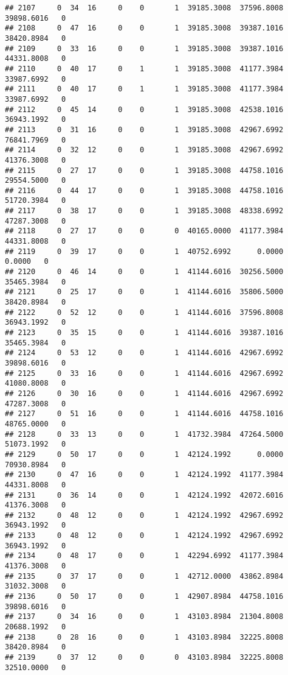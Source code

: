 \documentclass[
]{article}
\begin{document}
\begin{enumerate}
\begin{verbatim}
## 2107     0  34  16     0    0       1  39185.3008  37596.8008  39898.6016   0
## 2108     0  47  16     0    0       1  39185.3008  39387.1016  38420.8984   0
## 2109     0  33  16     0    0       1  39185.3008  39387.1016  44331.8008   0
## 2110     0  40  17     0    1       1  39185.3008  41177.3984  33987.6992   0
## 2111     0  40  17     0    1       1  39185.3008  41177.3984  33987.6992   0
## 2112     0  45  14     0    0       1  39185.3008  42538.1016  36943.1992   0
## 2113     0  31  16     0    0       1  39185.3008  42967.6992  76841.7969   0
## 2114     0  32  12     0    0       1  39185.3008  42967.6992  41376.3008   0
## 2115     0  27  17     0    0       1  39185.3008  44758.1016  29554.5000   0
## 2116     0  44  17     0    0       1  39185.3008  44758.1016  51720.3984   0
## 2117     0  38  17     0    0       1  39185.3008  48338.6992  47287.3008   0
## 2118     0  27  17     0    0       0  40165.0000  41177.3984  44331.8008   0
## 2119     0  39  17     0    0       1  40752.6992      0.0000      0.0000   0
## 2120     0  46  14     0    0       1  41144.6016  30256.5000  35465.3984   0
## 2121     0  25  17     0    0       1  41144.6016  35806.5000  38420.8984   0
## 2122     0  52  12     0    0       1  41144.6016  37596.8008  36943.1992   0
## 2123     0  35  15     0    0       1  41144.6016  39387.1016  35465.3984   0
## 2124     0  53  12     0    0       1  41144.6016  42967.6992  39898.6016   0
## 2125     0  33  16     0    0       1  41144.6016  42967.6992  41080.8008   0
## 2126     0  30  16     0    0       1  41144.6016  42967.6992  47287.3008   0
## 2127     0  51  16     0    0       1  41144.6016  44758.1016  48765.0000   0
## 2128     0  33  13     0    0       1  41732.3984  47264.5000  51073.1992   0
## 2129     0  50  17     0    0       1  42124.1992      0.0000  70930.8984   0
## 2130     0  47  16     0    0       1  42124.1992  41177.3984  44331.8008   0
## 2131     0  36  14     0    0       1  42124.1992  42072.6016  41376.3008   0
## 2132     0  48  12     0    0       1  42124.1992  42967.6992  36943.1992   0
## 2133     0  48  12     0    0       1  42124.1992  42967.6992  36943.1992   0
## 2134     0  48  17     0    0       1  42294.6992  41177.3984  41376.3008   0
## 2135     0  37  17     0    0       1  42712.0000  43862.8984  31032.3008   0
## 2136     0  50  17     0    0       1  42907.8984  44758.1016  39898.6016   0
## 2137     0  34  16     0    0       1  43103.8984  21304.8008  20688.1992   0
## 2138     0  28  16     0    0       1  43103.8984  32225.8008  38420.8984   0
## 2139     0  37  12     0    0       0  43103.8984  32225.8008  32510.0000   0

\end{verbatim}
\end{enumerate}
\end{document}
